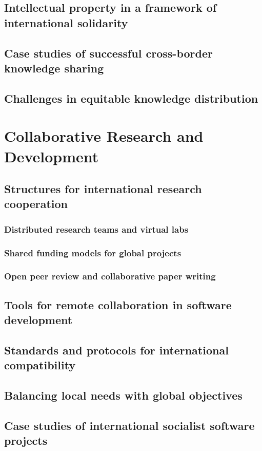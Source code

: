 \subsection{Intellectual property in a framework of international solidarity}
\subsection{Case studies of successful cross-border knowledge sharing}
\subsection{Challenges in equitable knowledge distribution}

\newpage

\section{Collaborative Research and Development}
\subsection{Structures for international research cooperation}
\subsubsection{Distributed research teams and virtual labs}
\subsubsection{Shared funding models for global projects}
\subsubsection{Open peer review and collaborative paper writing}
\subsection{Tools for remote collaboration in software development}
\subsection{Standards and protocols for international compatibility}
\subsection{Balancing local needs with global objectives}
\subsection{Case studies of international socialist software projects}
